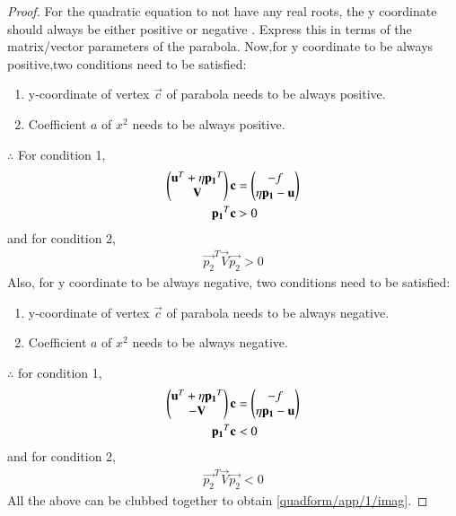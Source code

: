 \begin{proof}
For the quadratic equation to not have any real roots, the y coordinate should always be either positive or negative . Express this in terms of the matrix/vector parameters of the parabola.  Now,for y coordinate to be always positive,two conditions need to be satisfied:
\begin{enumerate}
 \item y-coordinate of vertex $\vec{c}$ of parabola needs to be always positive.
 \item Coefficient $a$ of $x^2$ needs to be always positive.
\end{enumerate}
$\therefore$ For condition 1,
\begin{align}
    \begin{pmatrix}\mathbf{u}^T + \eta\mathbf{p_1}^T \\ \mathbf{V}\end{pmatrix}\mathbf{c} &= \begin{pmatrix}-f \\ \eta\mathbf{p_1}-\mathbf{u}\end{pmatrix} \\
    \mathbf{p_1}^T\mathbf{c} &> 0
\end{align}
and for condition 2,
\begin{align}
    \vec{p_2}^T\vec{V}\vec{p_2} > 0
\end{align}
Also, for y coordinate to be always negative, two conditions need to be satisfied:
\begin{enumerate}
 \item y-coordinate of vertex $\vec{c}$ of parabola needs to be always negative.
 \item Coefficient $a$ of $x^2$ needs to be always negative.
\end{enumerate}
$\therefore$ for condition 1,
\begin{align}
    \begin{pmatrix}\mathbf{u}^T + \eta\mathbf{p_1}^T \\ -\mathbf{V}\end{pmatrix}\mathbf{c} &= \begin{pmatrix}-f \\ \eta\mathbf{p_1}-\mathbf{u}\end{pmatrix} \\
    \mathbf{p_1}^T\mathbf{c} &< 0
\end{align}
and for condition 2,
\begin{align}
    \vec{p_2}^T\vec{V}\vec{p_2} < 0
\end{align}
All the above  can be clubbed together to obtain     \eqref{quadform/app/1/imag}.
\end{proof}
